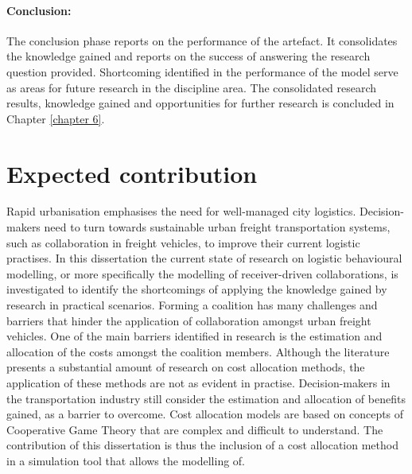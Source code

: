 \paragraph{Conclusion:} The conclusion phase reports on the performance of the artefact. It consolidates the knowledge gained and reports on the success of answering the research question provided. Shortcoming identified in the performance of the model serve as areas for future research in the discipline area. The consolidated research results, knowledge gained and opportunities for further research is concluded in Chapter \ref{chapter 6}.


\section{Expected contribution}
 Rapid urbanisation emphasises the need for well-managed city logistics. Decision-makers need to turn towards sustainable urban freight transportation systems, such as collaboration in freight vehicles, to improve their current logistic practises. 
 In this dissertation the current state of research on logistic behavioural modelling, or more specifically the modelling of receiver-driven collaborations, is investigated to identify the shortcomings of applying the knowledge gained by research in practical scenarios. Forming a coalition has many challenges and barriers that hinder the application of collaboration amongst urban freight vehicles. One of the main barriers identified in research is the estimation and allocation of the costs amongst the coalition members. Although the literature presents a substantial amount of research on cost allocation methods, the application of these methods are not as evident in practise. Decision-makers in the transportation industry still consider the estimation and allocation of benefits gained, as a barrier to overcome. Cost allocation models are based on concepts of Cooperative Game Theory that are complex and difficult to understand. The contribution of this dissertation is thus the inclusion of a cost allocation method in a simulation tool that allows the modelling of. 
 
